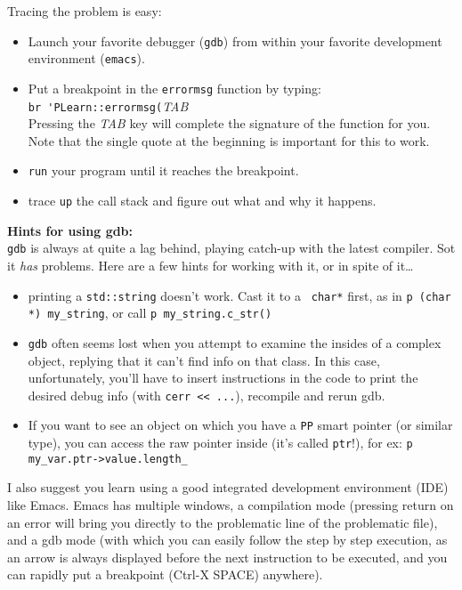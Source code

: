 \documentclass[11pt]{book}
\begin{document}
Tracing the problem is easy:
\begin{itemize}

\item Launch your favorite debugger ({\tt gdb}) from within your
favorite development environment ({\tt emacs}).

\item Put a breakpoint in the {\tt errormsg} function by typing: \\
\verb!br 'PLearn::errormsg(!{\it TAB} \\
Pressing the {\it TAB} key will complete the signature of the function
for you. Note that the single quote at the beginning is important for
this to work.

\item {\tt run} your program until it reaches the breakpoint.

\item trace {\tt up} the call stack and figure out what and why it
happens.

\end{itemize}

{\bf Hints for using gdb:} \\
{\tt gdb} is always at quite a lag behind, playing catch-up with the
latest compiler. Sot it {\em has} problems.  Here are a few hints for
working with it, or in spite of it\ldots
\begin{itemize}

\item printing a {\tt std::string} doesn't work. Cast it to a {\tt
  char*} first, as in \verb!p (char *) my_string!, or call
  \verb!p my_string.c_str()!

\item {\tt gdb} often seems lost when you attempt to examine the insides
  of a complex object, replying that it can't find info on that class.  In
  this case, unfortunately, you'll have to insert instructions in the code
  to print the desired debug info (with \verb!cerr << ...!), recompile and
  rerun gdb.

\item If you want to see an object on which you have a {\tt PP} smart
  pointer (or similar type), you can access the raw pointer inside (it's
  called {\tt ptr}!), for ex: \verb!p my_var.ptr->value.length_!
\end{itemize}

I also suggest you learn using a good integrated development
environment (IDE) like Emacs. Emacs has multiple windows, a compilation
mode (pressing return on an error will bring you directly to the
problematic line of the problematic file), and a gdb mode (with
which you can easily follow the step by step execution, as an arrow
is always displayed before the next instruction to be executed, and
you can rapidly put a breakpoint (Ctrl-X SPACE) anywhere).
\end{document}
